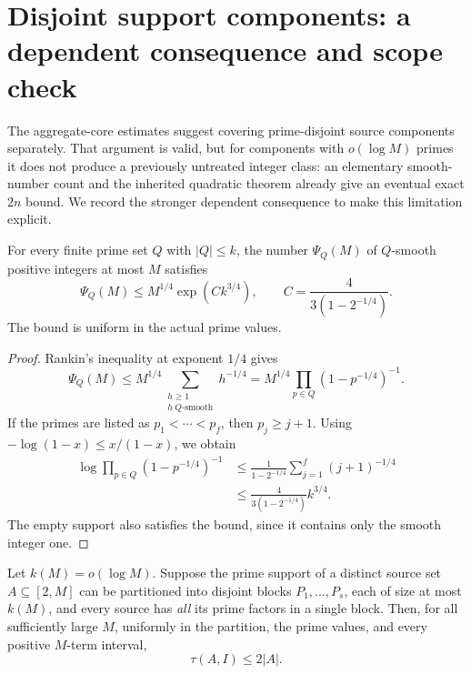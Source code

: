 \section{Disjoint support components: a dependent consequence and scope check}
\label{bs:section}

The aggregate-core estimates suggest covering prime-disjoint source
components separately. That argument is valid, but for components with
$o(\log M)$ primes it does not produce a previously untreated integer
class: an elementary smooth-number count and the inherited quadratic
theorem already give an eventual exact $2n$ bound. We record the stronger
dependent consequence to make this limitation explicit.

\begin{lemma}
\label{bs:rankin}
For every finite prime set $Q$ with $|Q|\le k$, the number $\Psi_Q(M)$
of $Q$-smooth positive integers at most $M$ satisfies
\begin{equation}
 \Psi_Q(M)\le M^{1/4}\exp(Ck^{3/4}),
 \qquad C=\frac4{3(1-2^{-1/4})}.
 \label{bs:smooth-count}
\end{equation}
The bound is uniform in the actual prime values.
\end{lemma}

\begin{proof}
Rankin's inequality at exponent $1/4$ gives
\[
 \Psi_Q(M)\le
 M^{1/4}\sum_{\substack{h\ge1\\h\ Q\text{-smooth}}}h^{-1/4}
 =M^{1/4}\prod_{p\in Q}(1-p^{-1/4})^{-1}.
\]
If the primes are listed as $p_1<\cdots<p_f$, then $p_j\ge j+1$.
Using $-\log(1-x)\le x/(1-x)$, we obtain
\[
 \begin{split}
 \log\prod_{p\in Q}(1-p^{-1/4})^{-1}
 &\le\frac1{1-2^{-1/4}}\sum_{j=1}^f(j+1)^{-1/4}\\
 &\le\frac4{3(1-2^{-1/4})}k^{3/4}.
 \end{split}
\]
The empty support also satisfies the bound, since it contains only
the smooth integer one.
\end{proof}

\begin{corollary}
\label{bs:exact}
Let $k(M)=o(\log M)$. Suppose the prime support of a distinct source set
$A\subseteq[2,M]$ can be partitioned into disjoint blocks
$P_1,\ldots,P_s$, each of size at most $k(M)$, and every source has
\emph{all} its prime factors in a single block. Then, for all sufficiently
large $M$, uniformly in the partition, the prime values, and every
positive $M$-term interval,
\[
 \tau(A,I)\le2|A|.
 \]
\end{corollary}

